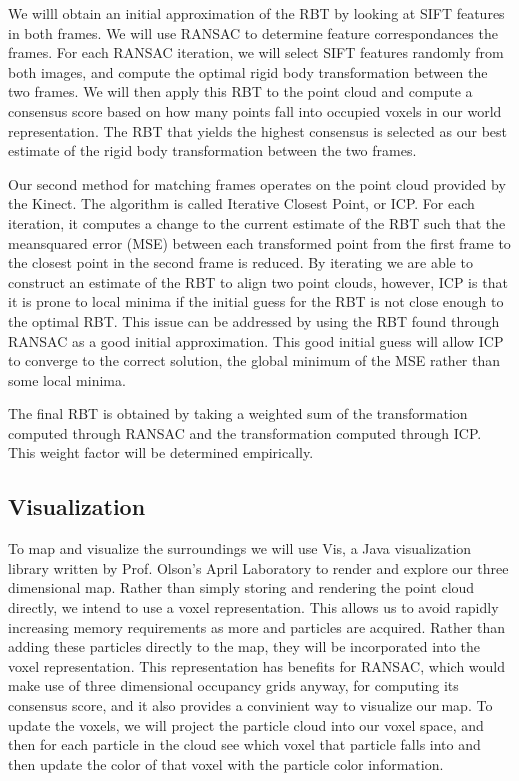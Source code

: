 \documentclass[12pt]{article}
\begin{document}
We willl obtain an initial approximation of the RBT by looking at SIFT features in both frames. We will use RANSAC to determine feature correspondances the frames.  For each RANSAC iteration, we will select SIFT features randomly from both images, and compute the optimal rigid body transformation between the two frames.  We will then apply this RBT to the point cloud and compute a consensus score based on how many points fall into occupied voxels in our world representation.  The RBT that yields the highest consensus is selected as our best estimate of the rigid body transformation between the two frames.

Our second method for matching frames operates on the point cloud provided by the Kinect. The algorithm is called Iterative Closest Point, or ICP. For each iteration, it computes a change to the current estimate of the RBT such that the meansquared error (MSE) between each transformed point from the first frame to the closest point in the second frame is reduced.  By iterating we are able to construct an estimate of the RBT to align two point clouds, however, ICP is that it is prone to local minima if the initial guess for the RBT is not close enough to the optimal RBT. This issue can be addressed by using the RBT found through RANSAC as a good initial approximation.  This good initial guess will allow ICP to converge to the correct solution, the global minimum of the MSE rather than some local minima.

The final RBT is obtained by taking a weighted sum of the transformation computed through RANSAC and the transformation computed through ICP. This weight factor will be determined empirically.


\subsection{Visualization}
To map and visualize the surroundings we will use Vis, a Java visualization library written by Prof. Olson's April Laboratory to render and explore our three dimensional map. Rather than simply storing and rendering the point cloud directly, we intend to use a voxel representation.  This allows us to avoid rapidly increasing memory requirements as more and particles are acquired.  Rather than adding these particles directly to the map, they will be incorporated into the voxel representation.  This representation has benefits for RANSAC, which would make use of three dimensional occupancy grids anyway, for computing its consensus score, and it also provides a convinient way to visualize our map.  To update the voxels, we will project the particle cloud into our voxel space, and then for each particle in the cloud see which voxel that particle falls into and then update the color of that voxel with the particle color information.
\end{document}
